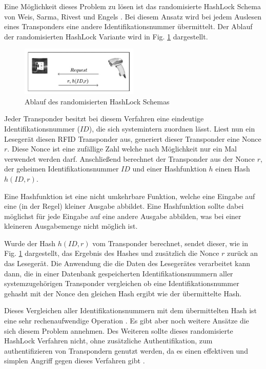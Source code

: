 \documentclass[conference]{IEEEtran}
\begin{document}
Eine Möglichkeit dieses Problem zu lösen ist das randomisierte HashLock Schema von Weis, Sarma, Rivest und Engels \cite{b9}. Bei diesem Ansatz wird bei jedem Auslesen eines Transponders eine andere Identifikationsnummer übermittelt. Der Ablauf der randomisierten HashLock Variante wird in Fig. \ref{fig5} dargestellt.

\begin{figure}[htbp]
\centerline{\includegraphics[width=0.5\textwidth]{img/hashlock.png}}
\caption{Ablauf des randomisierten HashLock Schemas \cite{b9}}
\label{fig5}
\end{figure}

Jeder Transponder besitzt bei diesem Verfahren eine eindeutige Identifikationsnummer ($ID$), die sich systemintern zuordnen lässt. Liest nun ein Lesegerät diesen RFID Transponder aus, generiert dieser Transponder eine Nonce $r$. Diese Nonce ist eine zufällige Zahl welche nach Möglichkeit nur ein Mal verwendet werden darf. Anschließend berechnet der Transponder aus der Nonce $r$, der geheimen Identifikationsnummer $ID$ und einer Hashfunktion $h$ einen Hash $h(ID, r)$. 

Eine Hashfunktion ist eine nicht umkehrbare Funktion, welche eine Eingabe auf eine (in der Regel) kleiner Ausgabe abbildet. Eine Hashfunktion sollte dabei möglichst für jede Eingabe auf eine andere Ausgabe abbilden, was bei einer kleineren Ausgabemenge nicht möglich ist.

Wurde der Hash $h(ID, r)$ vom Transponder berechnet, sendet dieser, wie in Fig. \ref{fig5} dargestellt, das Ergebnis des Hashes und zusätzlich die Nonce $r$ zurück an das Lesegerät. Die Anwendung die die Daten des Lesegerätes verarbeitet kann dann, die in einer Datenbank gespeicherten Identifikationsnummern aller systemzugehörigen Transponder vergleichen ob eine Identifikationsnummer gehasht mit der Nonce den gleichen Hash ergibt wie der übermittelte Hash.

Dieses Vergleichen aller Identifikationsnummern mit dem übermittelten Hash ist eine sehr rechenaufwendige Operation \cite{b9}. Es gibt aber noch weitere Ansätze die sich diesem Problem annehmen. Des Weiteren sollte dieses randomisierte HashLock Verfahren nicht, ohne zusätzliche Authentifikation, zum authentifizieren von Transpondern genutzt werden, da es einen effektiven und simplen Angriff gegen dieses Verfahren gibt \cite{b9}.
\end{document}
